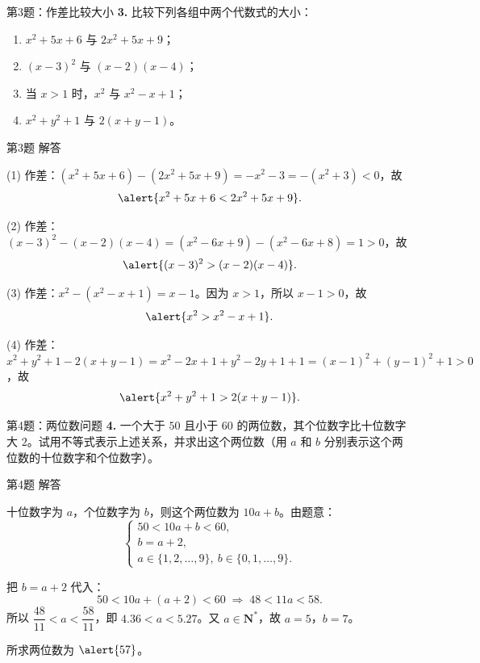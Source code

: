 \documentclass[10pt,aspectratio=169,serif]{beamer}
\begin{document}
\begin{frame}[t]{第3题：作差比较大小}
\textbf{3.} 比较下列各组中两个代数式的大小：

\vspace{0.5em}
\begin{enumerate}[(1)]
  \item $x^2+5x+6$ 与 $2x^2+5x+9$；
  \item $(x-3)^2$ 与 $(x-2)(x-4)$；
  \item 当 $x>1$ 时，$x^2$ 与 $x^2-x+1$；
  \item $x^2+y^2+1$ 与 $2(x+y-1)$。
\end{enumerate}
\end{frame}

\begin{frame}[t]{第3题 解答}
\begin{tcolorbox}[colback=orange!10,colframe=orange,title=\textbf{解}]
(1) 作差：$(x^2+5x+6)-(2x^2+5x+9)=-x^2-3=-(x^2+3)<0$，故
\[
\alert{x^2+5x+6 < 2x^2+5x+9}.
\]

(2) 作差：$(x-3)^2-(x-2)(x-4)=(x^2-6x+9)-(x^2-6x+8)=1>0$，故
\[
\alert{(x-3)^2 > (x-2)(x-4)}.
\]

(3) 作差：$x^2-(x^2-x+1)=x-1$。因为 $x>1$，所以 $x-1>0$，故
\[
\alert{x^2 > x^2-x+1}.
\]

(4) 作差：$x^2+y^2+1-2(x+y-1)=x^2-2x+1+y^2-2y+1+1=(x-1)^2+(y-1)^2+1>0$，故
\[
\alert{x^2+y^2+1 > 2(x+y-1)}.
\]
\end{tcolorbox}
\end{frame}

\begin{frame}[t]{第4题：两位数问题}
\textbf{4.} 一个大于 $50$ 且小于 $60$ 的两位数，其个位数字比十位数字大 $2$。试用不等式表示上述关系，并求出这个两位数（用 $a$ 和 $b$ 分别表示这个两位数的十位数字和个位数字）。
\end{frame}

\begin{frame}[t]{第4题 解答}
\begin{tcolorbox}[colback=orange!10,colframe=orange,title=\textbf{解}]
十位数字为 $a$，个位数字为 $b$，则这个两位数为 $10a+b$。由题意：
\[
\begin{cases}
50 < 10a+b < 60,\\
b = a+2,\\
a\in\{1,2,\dots,9\},\ b\in\{0,1,\dots,9\}.
\end{cases}
\]

把 $b=a+2$ 代入：
\[
50 < 10a+(a+2) < 60 \;\Longrightarrow\; 48 < 11a < 58.
\]
所以 $\dfrac{48}{11}<a<\dfrac{58}{11}$，即 $4.36<a<5.27$。又 $a\in\mathbf{N}^*$，故 $a=5$，$b=7$。

\vspace{0.5em}
所求两位数为 $\alert{57}$。
\end{tcolorbox}
\end{frame}
\end{document}

